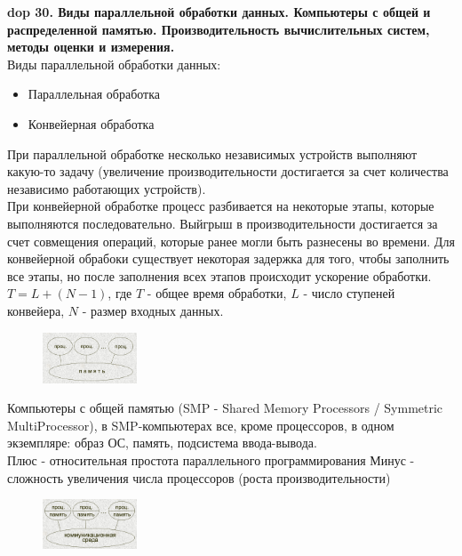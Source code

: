 \textbf{\LARGE dop 30. Виды параллельной обработки данных. Компьютеры с общей и распределенной памятью. Производительность вычислительных систем, методы оценки и измерения.}\\

Виды параллельной обработки данных:
\begin{itemize}
    \item Параллельная обработка
    \item Конвейерная обработка
\end{itemize}

При параллельной обработке несколько независимых устройств выполняют какую-то задачу (увеличение производительности достигается за счет количества независимо работающих устройств).\\
При конвейерной обработке процесс разбивается на некоторые этапы, которые выполняются последовательно. Выйгрыш в производительности достигается за счет совмещения операций, которые ранее могли быть разнесены во времени. Для конвейерной обрабоки существует некоторая задержка для того, чтобы заполнить все этапы, но после заполнения всех этапов происходит ускорение обработки. $T = L + (N - 1)$, где $T$ - общее время обработки, $L$ - число ступеней конвейера, $N$ - размер входных данных.\\

\begin{figure}
    \centering
    \includegraphics[width=0.25\textwidth]{pics/smp-computer.png}
\end{figure}

Компьютеры с общей памятью (SMP - Shared Memory Processors / Symmetric MultiProcessor), в SMP-компьютерах все, кроме процессоров, в одном экземпляре: образ ОС, память, подсистема ввода-вывода.\\
Плюс - относительная простота параллельного программирования
Минус - сложность увеличения числа процессоров (роста производительности)\\


\begin{figure}
    \centering
    \includegraphics[width=0.25\textwidth]{pics/distributed-memory-computer.png}
\end{figure}

